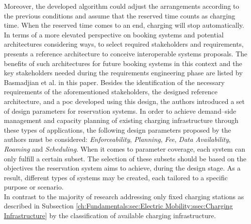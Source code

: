 Moreover, the developed algorithm could adjust the arrangements according to the previous conditions and assume that the reserved time counts as charging time. When the reserved time comes to an end, charging will stop automatically. \\
\noindent In terms of a more elevated perspective on booking systems and potential architectures considering ways, to select required stakeholders and requirements, \cite{basmadjian_reference_2020} presents a reference architecture to conceive interoperable systems proposals.
The benefits of such architectures for future booking systems in this context and the key stakeholders needed during the requirements engineering phase are listed by Basmadjian et al. in this paper.
Besides the identification of the necessary requirements of the aforementioned stakeholders, the designed reference architecture, and a \acrshort{poc} developed using this design, the authors introduced a set of design parameters for reservation systems.
In order to achieve demand--side management and capacity planning of existing charging infrastructure through these types of applications, the following design parameters proposed by the authors must be considered: \textit{Enforceability}, \textit{Planning}, \textit{Fee}, \textit{Data Availability}, \textit{Roaming} and \textit{Scheduling}.
When it comes to parameter coverage, each system can only fulfill a certain subset. The selection of these subsets should be based on the objectives the reservation system aims to achieve, during the design stage.
As a result, different types of systems may be created, each tailored to a specific purpose or scenario. \\
\noindent In contrast to the majority of research addressing only fixed charging stations as described in Subsection \ref{ch:Fundamentals:sec:Electric Mobility:ssec:Charging Infrastructure} by the classification of available charging infrastructure.
